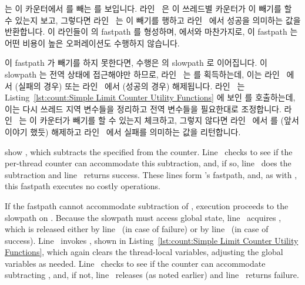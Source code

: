 \begin{fcvref}
 는 이 카운터에서  를 빼는  를
보입니다.
라인~ 은 이 쓰레드별 카운터가 이 빼기를 할 수 있는지 보고,
그렇다면 라인~ 는 이 빼기를 행하고 라인~ 에서
성공을 의미하는 값을 반환합니다.
이 라인들이  의 fastpath 를 형성하며,  에서와
마찬가지로, 이 fastpath 는 어떤 비용이 높은 오퍼레이션도 수행하지 않습니다.

이 fastpath 가  빼기를 하지 못한다면, 수행은
 의 slowpath 로 이어집니다.
이 slowpath 는 전역 상태에 접근해야만 하므로, 라인~ 는
 를 획득하는데, 이는 라인~ 에서 (실패의 경우)
또는 라인~ 에서 (성공의 경우) 해제됩니다.
라인~ 는
Listing~\ref{lst:count:Simple Limit Counter Utility Functions}
에 보인  를 호출하는데, 이는 다시 쓰레드 지역 변수들을
정리하고 전역 변수들을 필요한대로 조정합니다.
라인~ 는 이 카운터가  빼기를 할 수 있는지 체크하고,
그렇지 않다면 라인~ 에서  를 (앞서 이야기
했듯) 해제하고 라인~ 에서 실패를 의미하는 값을 리턴합니다.
\end{fcvref}

\iffalse

\begin{fcvref}
 show ,
which subtracts the specified
 from the counter.
Line~ checks to see if the per-thread counter can accommodate
this subtraction, and, if so, line~ does the subtraction and
line~ returns success.
These lines form 's fastpath, and, as with
, this fastpath executes no costly operations.

If the fastpath cannot accommodate subtraction of ,
execution proceeds to the slowpath on
.
Because the slowpath must access global state, line~
acquires , which is released either by line~
(in case of failure) or by line~ (in case of success).
Line~ invokes , shown in
Listing~\ref{lst:count:Simple Limit Counter Utility Functions},
which again clears the thread-local variables, adjusting the global variables
as needed.
Line~ checks to see if the counter can accommodate subtracting
, and, if not, line~ releases 
(as noted earlier) and line~ returns failure.
\end{fcvref}

